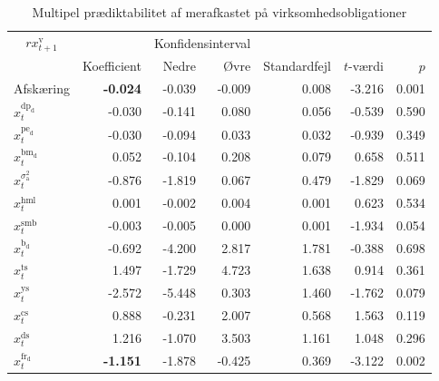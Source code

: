 \documentclass[
  a4paper,
  oneside]{memoir}
\begin{document}
\begin{table}[!h]
\begin{threeparttable}
\begin{tablenotes}
\end{tablenotes}
\end{threeparttable}
\end{table}

\begin{table}[!h]

\caption{\label{tab:MULT-v}Multipel prædiktabilitet af merafkastet på virksomhedsobligationer}
\centering
\begin{threeparttable}
\begin{tabular}[t]{lrrrrrr}
\toprule
\multicolumn{1}{c}{$rx_{t+1}^{\text{v}}$} & \multicolumn{1}{c}{ } & \multicolumn{2}{c}{Konfidensinterval} & \multicolumn{3}{c}{ } \\
\cmidrule(l{3pt}r{3pt}){1-1} \cmidrule(l{3pt}r{3pt}){3-4}
  & Koefficient & Nedre & Øvre & Standardfejl & $t$-værdi & $p$\\
\midrule
\rowcolor{gray!6}  Afskæring & \textbf{-0.024} & -0.039 & -0.009 & 0.008 & -3.216 & 0.001\\
$x_t^{\text{dp}_{\text{d}}}$ & -0.030 & -0.141 & 0.080 & 0.056 & -0.539 & 0.590\\
\rowcolor{gray!6}  $x_t^{\text{pe}_{\text{d}}}$ & -0.030 & -0.094 & 0.033 & 0.032 & -0.939 & 0.349\\
$x_t^{\text{bm}_{\text{d}}}$ & 0.052 & -0.104 & 0.208 & 0.079 & 0.658 & 0.511\\
\rowcolor{gray!6}  $x_t^{\sigma_{\text{a}}^2}$ & -0.876 & -1.819 & 0.067 & 0.479 & -1.829 & 0.069\\
$x_t^{\text{hml}}$ & 0.001 & -0.002 & 0.004 & 0.001 & 0.623 & 0.534\\
\rowcolor{gray!6}  $x_t^{\text{smb}}$ & -0.003 & -0.005 & 0.000 & 0.001 & -1.934 & 0.054\\
$x_t^{\text{b}_{\text{d}}}$ & -0.692 & -4.200 & 2.817 & 1.781 & -0.388 & 0.698\\
\rowcolor{gray!6}  $x_t^{\text{ts}}$ & 1.497 & -1.729 & 4.723 & 1.638 & 0.914 & 0.361\\
$x_t^{\text{ys}}$ & -2.572 & -5.448 & 0.303 & 1.460 & -1.762 & 0.079\\
\rowcolor{gray!6}  $x_t^{\text{cs}}$ & 0.888 & -0.231 & 2.007 & 0.568 & 1.563 & 0.119\\
$x_t^{\text{ds}}$ & 1.216 & -1.070 & 3.503 & 1.161 & 1.048 & 0.296\\
\rowcolor{gray!6}  $x_t^{\text{fr}_{\text{d}}}$ & \textbf{-1.151} & -1.878 & -0.425 & 0.369 & -3.122 & 0.002\\
\bottomrule
\end{tabular}

\end{threeparttable}
\end{table}
\end{document}
